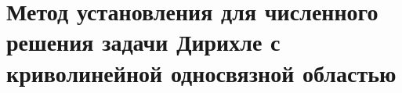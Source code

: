 


\section{Метод установления для численного решения задачи Дирихле с криволинейной односвязной областью}


